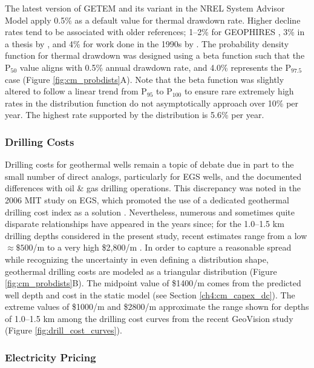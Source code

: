 The latest version of GETEM \citep{mines_getem_2016} and its variant in the NREL System Advisor Model \citep{blair_system_2018} apply 0.5\% as a default value for thermal drawdown rate. Higher decline rates tend to be associated with older references; 1--2\% for GEOPHIRES \citep{beckers_low-temperature_2016}, 3\% in a thesis by \citet{augustine_hydrothermal_2009}, and 4\% for work done in the 1990s by \citet{tester_economic_1990}. The probability density function for thermal drawdown was designed using a beta function such that the P$_{50}$ value aligns with 0.5\% annual drawdown rate, and 4.0\% represents the P$_{97.5}$ case (Figure \ref{fig:cm_probdists}A). Note that the beta function was slightly altered to follow a linear trend from P$_{95}$ to P$_{100}$ to ensure rare extremely high rates in the distribution function do not asymptotically approach over 10\% per year. The highest rate supported by the distribution is 5.6\% per year.

\subsubsection{Drilling Costs}\label{cm4:prob_dc}

Drilling costs for geothermal wells remain a topic of debate due in part to the small number of direct analogs, particularly for EGS wells, and the documented differences with oil \& gas drilling operations. This discrepancy was noted in the 2006 MIT study on EGS, which promoted the use of a dedicated geothermal drilling cost index as a solution \citep{tester_future_2006}. Nevertheless, numerous and sometimes quite disparate relationships have appeared in the years since; for the 1.0--1.5 km drilling depths considered in the present study, recent estimates range from a low $\approx\$500$/m \citep{lukawski_uncertainty_2016} to a very high \$2,800/m \citep{lowry_implications_2017}. In order to capture a reasonable spread while recognizing the uncertainty in even defining a distribution shape, geothermal drilling costs are modeled as a triangular distribution (Figure \ref{fig:cm_probdists}B). The midpoint value of \$1400/m comes from the predicted well depth and cost in the static model (see Section \ref{ch4:cm_capex_dc}). The extreme values of \$1000/m and \$2800/m approximate the range shown for depths of 1.0--1.5 km among the drilling cost curves from the recent GeoVision study (Figure \ref{fig:drill_cost_curves}).

\subsubsection{Electricity Pricing}\label{cm4:prob_price}

